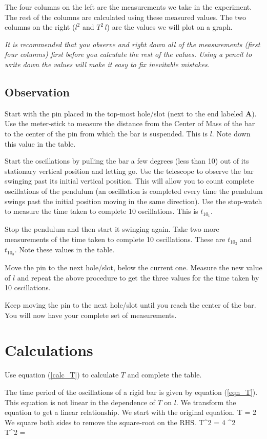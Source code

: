 \documentclass{article}
\begin{document}
         The four columns on the left are the measurements we take in the experiment. The rest of the columns are calculated using these measured values. The two columns on the right ($l^2$ and $T^2 \, l$) are the values we will plot on a graph.

         \textit{It is recommended that you observe and right down all of the measurements (first four columns) first before you calculate the rest of the values. Using a pencil to write down the values will make it easy to fix inevitable mistakes.}

      \subsection*{Observation}

      Start with the pin placed in the top-most hole/slot (next to the end labeled \textbf{A}). Use the meter-stick to measure the distance from the Center of Mass of the bar to the center of the pin from which the bar is suspended. This is $l$. Note down this value in the table.

      Start the oscillations by pulling the bar a few degrees (less than 10) out of its stationary vertical position and letting go. Use the telescope to observe the bar swinging past its initial vertical position. This will allow you to count complete oscillations of the pendulum (an oscillation is completed every time the pendulum swings past the initial position moving in the same direction). Use the stop-watch to measure the time taken to complete 10 oscillations. This is $t_{10_1}$.

      Stop the pendulum and then start it swinging again. Take two more measurements of the time taken to complete 10 oscillations. These are $t_{10_2}$ and $t_{10_3}$. Note these values in the table.

      Move the pin to the next hole/slot, below the current one. Measure the new value of $l$ and repeat the above procedure to get the three values for the time taken by 10 oscillations.

      Keep moving the pin to the next hole/slot until you reach the center of the bar. You will now have your complete set of measurements.


   \section*{Calculations}

      Use equation (\ref{calc_T}) to calculate $T$ and complete the table.

      The time period of the oscillations of a rigid bar is given by equation (\ref{eqn_T}). This equation is not linear in the dependence of $T$ on $l$. We transform the equation to get a linear relationship. We start with the original equation.
%
      \beqn
         T = 2 \pi {}
      \eeqn
      We square both sides to remove the square-root on the RHS.
      \beqsn
         T^2 = 4 \pi^2  \\[0.25\baselineskip]
         \imply T^2 =  
      \eeqsn
         
\end{document}
